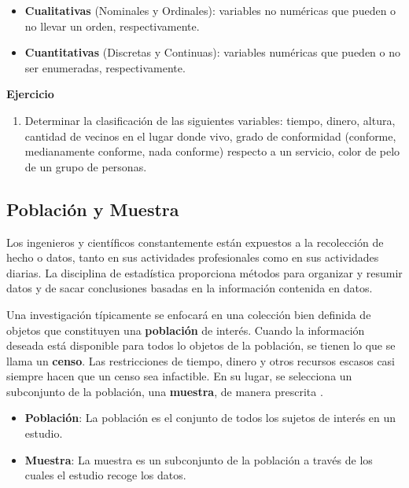 \documentclass[
]{book}
\providecommand{\tightlist}{%
  \setlength{\itemsep}{0pt}\setlength{\parskip}{0pt}}
\begin{document}
\begin{itemize}
\tightlist
\item
  \textbf{Cualitativas} (Nominales y Ordinales): variables no numéricas que pueden o no llevar un orden, respectivamente.
\item
  \textbf{Cuantitativas} (Discretas y Continuas): variables numéricas que pueden o no ser enumeradas, respectivamente.
\end{itemize}

\textbf{Ejercicio}

\begin{enumerate}
\def\labelenumi{\arabic{enumi}.}
\tightlist
\item
  Determinar la clasificación de las siguientes variables: tiempo, dinero, altura, cantidad de vecinos en el lugar donde vivo, grado de conformidad (conforme, medianamente conforme, nada conforme) respecto a un servicio, color de pelo de un grupo de personas.
\end{enumerate}

\hypertarget{poblaciuxf3n-y-muestra}{%
\subsection{Población y Muestra}\label{poblaciuxf3n-y-muestra}}

Los ingenieros y científicos constantemente están expuestos a la recolección de hecho o datos, tanto en sus actividades profesionales como en sus actividades diarias. La disciplina de estadística proporciona métodos para organizar y resumir datos y de sacar conclusiones basadas en la información contenida en datos.

Una investigación típicamente se enfocará en una colección bien definida de objetos que constituyen una \textbf{población} de interés. Cuando la información deseada está disponible para todos lo objetos de la población, se tienen lo que se llama un \textbf{censo}. Las restricciones de tiempo, dinero y otros recursos escasos casi siempre hacen que un censo sea infactible. En su lugar, se selecciona un subconjunto de la población, una \textbf{muestra}, de manera prescrita \citep[página 2]{Devore}.

\begin{itemize}
\tightlist
\item
  \textbf{Población}: La población es el conjunto de todos los sujetos de interés en un estudio.
\item
  \textbf{Muestra}: La muestra es un subconjunto de la población a través de los cuales el estudio recoge los datos.
\end{itemize}
\end{document}
